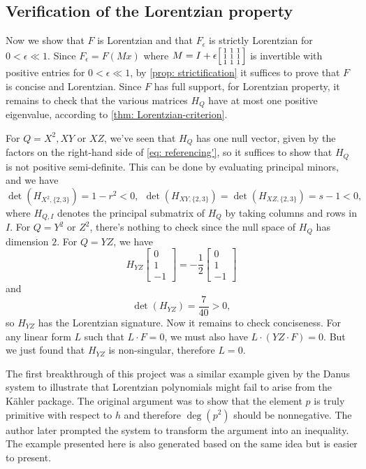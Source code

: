 \subsection{Verification of the Lorentzian property}
Now we show that $F$ is Lorentzian and that $F_\epsilon$ is strictly Lorentzian for $0<\epsilon\ll 1$. Since $F_{\epsilon}=F(Mx)$ where $M=I+\epsilon \begin{bsmallmatrix}
    1&1&1\\1&1&1\\1&1&1
\end{bsmallmatrix}$ is invertible with positive entries for $0<\epsilon \ll 1$, by \cref{prop: strictification} it suffices to prove that $F$ is concise and Lorentzian. Since $F$ has full support, for Lorentzian property, it remains to check that the various matrices $H_Q$ have at most one positive eigenvalue, according to \cref{thm: Lorentzian-criterion}.

For $Q=X^2,XY$ or $XZ$, we've seen that $H_Q$ has one null vector, given by the factors on the right-hand side of \eqref{eq: referencing'}, so it suffices to show that $H_Q$ is not positive semi-definite. This can be done by evaluating principal minors, and we have
\[
    \det(H_{X^2,\{2,3\}})=1-r^2<0,\ \ \det(H_{XY,\{2,3\}})=\det(H_{XZ,\{2,3\}})=s-1<0,
\]
where $H_{Q,I}$ denotes the principal submatrix of $H_Q$ by taking columns and rows in $I$. For $Q=Y^2$ or $Z^2$, there's nothing to check since the null space of $H_Q$ has dimension $2$. For $Q=YZ$, we have
\[
    H_{YZ}\begin{bmatrix}
        0\\1\\-1
    \end{bmatrix}=-\frac{1}{2}\begin{bmatrix}
        0\\1\\-1
    \end{bmatrix}
\]
and
\[
    \det(H_{YZ})=\frac{7}{40}>0,
\]
so $H_{YZ}$ has the Lorentzian signature.
    Now it remains to check conciseness. For any linear form $L$ such that $L\cdot F=0$, we must also have $L\cdot(YZ\cdot F)=0$. But we just found that $H_{YZ}$ is non-singular, therefore $L=0$.

\begin{remark}
    The first breakthrough of this project was a similar example given by the Danus system to illustrate that Lorentzian polynomials might fail to arise from the K\"ahler package. The original argument was to show that the element $p$ is truly primitive with respect to $h$ and therefore $\deg(p^2)$ should be nonnegative. The author later prompted the system to transform the argument into an inequality. The example presented here is also generated based on the same idea but is easier to present.
\end{remark}

